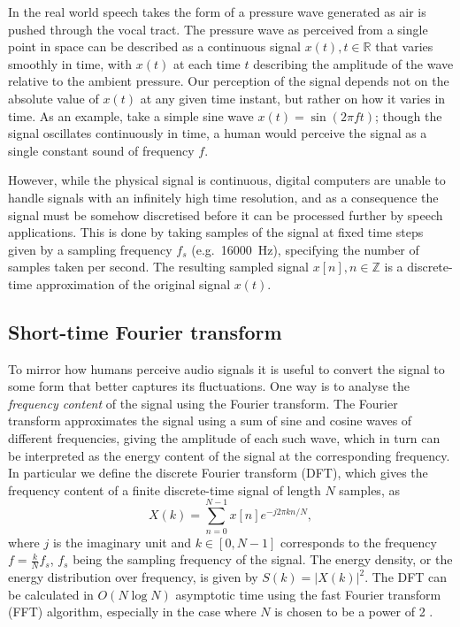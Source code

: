 In the real world speech takes the form of a pressure wave generated as air is pushed through the vocal tract.
The pressure wave as perceived from a single point in space can be described as a continuous signal $x(t), t\in \mathbb{R}$ that varies smoothly in time, with $x(t)$ at each time $t$ describing the amplitude of the wave relative to the ambient pressure.
Our perception of the signal depends not on the absolute value of $x(t)$ at any given time instant, but rather on how it varies in time.
As an example, take a simple sine wave $x(t) = \sin(2\pi f t)$; though the signal oscillates continuously in time, a human would perceive the signal as a single constant sound of frequency $f$.

However, while the physical signal is continuous, digital computers are unable to handle signals with an infinitely high time resolution, and as a consequence the signal must be somehow discretised before it can be processed further by speech applications.
This is done by taking samples of the signal at fixed time steps given by a sampling frequency $f_s$ (e.g.\ \SI{16000}{\Hz}), specifying the number of samples taken per second.
The resulting sampled signal $x[n], n \in \mathbb{Z}$ is a discrete-time approximation of the original signal $x(t)$.

\subsection{Short-time Fourier transform}

To mirror how humans perceive audio signals it is useful to convert the signal to some form that better captures its fluctuations.
One way is to analyse the \emph{frequency content} of the signal using the Fourier transform.
The Fourier transform approximates the signal using a sum of sine and cosine waves of different frequencies, giving the amplitude of each such wave, which in turn can be interpreted as the energy content of the signal at the corresponding frequency.
In particular we define the discrete Fourier transform (DFT), which gives the frequency content of a finite discrete-time signal of length $N$ samples, as
\begin{equation}
X(k) = \sum_{n=0}^{N-1} x[n]e^{-j2\pi kn/N},
\end{equation}
where $j$ is the imaginary unit and $k \in [0, N-1]$ corresponds to the frequency $f = \frac{k}{N}f_s$, $f_s$ being the sampling frequency of the signal.
The energy density, or the energy distribution over frequency, is given by $S(k) = \left|X(k)\right|^2$.
The DFT can be calculated in $O(N \log N)$ asymptotic time using the fast Fourier transform (FFT) algorithm, especially in the case where $N$ is chosen to be a power of 2 \parencite{cooley1965algorithm}.

